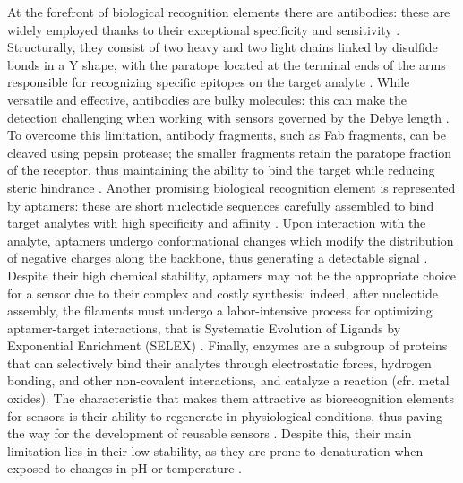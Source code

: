At the forefront of biological recognition elements there are antibodies: these are widely employed thanks to their exceptional specificity and sensitivity \citep{shkodraElectrolytegated2021}. Structurally, they consist of two heavy and two light chains linked by disulfide bonds in a Y shape, with the paratope located at the terminal ends of the arms responsible for recognizing specific epitopes on the target analyte \citep{moralesGuide2018}. While versatile and effective, antibodies are bulky molecules: this can make the detection challenging when working with sensors governed by the Debye length \citep{nakatsukaAptamer2018, shkodraElectrolytegated2021}. To overcome this limitation, antibody fragments, such as Fab fragments, can be cleaved using pepsin protease; the smaller fragments retain the paratope fraction of the receptor, thus maintaining the ability to bind the target while reducing steric hindrance \citep{crivianu-gaitaAptamers2016}.
%
Another promising biological recognition element is represented by aptamers: these are short nucleotide sequences carefully assembled to bind target analytes with high specificity and affinity \citep{shkodraElectrolytegated2021}. Upon interaction with the analyte, aptamers undergo conformational changes which modify the distribution of negative charges along the backbone, thus generating a detectable signal \citep{nakatsukaAptamer2018}. Despite their high chemical stability, aptamers may not be the appropriate choice for a sensor due to their complex and costly synthesis: indeed, after nucleotide assembly, the filaments must undergo a labor-intensive process for optimizing aptamer-target interactions, that is Systematic Evolution of Ligands by Exponential Enrichment (SELEX) \citep{ellingtonVitro1990, tuerkSystematic1990}.
%
Finally, enzymes are a subgroup of proteins that can selectively bind their analytes through electrostatic forces, hydrogen bonding, and other non-covalent interactions, and catalyze a reaction (cfr. metal oxides). The characteristic that makes them attractive as biorecognition elements for sensors is their ability to regenerate in physiological conditions, thus paving the way for the development of reusable sensors \citep{bocanegra-rodriguezNew2020}. Despite this, their main limitation lies in their low stability, as they are prone to denaturation when exposed to changes in pH or temperature \citep{herletNew2017}.

